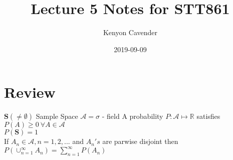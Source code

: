 \documentclass[12pt, oneside, letterpaper]{notes}
\begin{document}
\title{Lecture 5 Notes for STT861}
\author{Kenyon Cavender}
\date{2019-09-09}
\maketitle

\section{Review}
$\textbf{S} (\neq \emptyset)$ Sample Space
$\mathscr{A} = \sigma$ - field
A probability $P: \mathscr{A} \mapsto \mathbb{R}$ satisfies
	\index $P(A) \geq 0 \: \forall A \in \mathscr{A} $\\
	\index $P(\textbf{S}) = 1$ \\
	\index If $A_n \in \mathscr{A}, n=1, 2, ...$ and $A_n's$ are parwise disjoint
	then $P(\cup_{n=1}^{\infty} A_n) = \sum_{n=1}^{\infty} P(A_n)$
\end{document}
